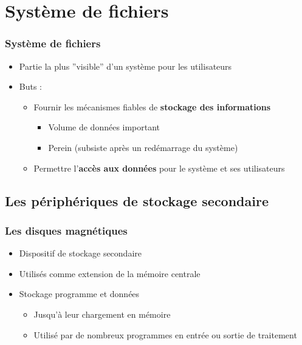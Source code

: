 




\section{Système de fichiers}

\begin{frame}
\frametitle{Système de fichiers}
\begin{itemize}
\item Partie la plus ''visible'' d'un système pour les utilisateurs
\item Buts :
\begin{itemize}
\item Fournir les mécanismes fiables de \textbf{stockage des informations}
\begin{itemize}
\item Volume de données important
\item Perein (subsiste après un redémarrage du système)
\end{itemize}
\item Permettre l'\textbf{accès aux données} pour le système et ses utilisateurs
\end{itemize}
\end{itemize}
\end{frame}


\subsection{Les périphériques de stockage secondaire}

\begin{frame}
\frametitle{Les disques magnétiques}
\begin{itemize}
\item Dispositif de stockage secondaire
\item Utilisés comme extension de la mémoire centrale
\item Stockage programme et données
\begin{itemize}
\item Jusqu’à leur chargement en mémoire
\item Utilisé par de nombreux programmes en entrée ou sortie de traitement
\end{itemize}
\end{itemize}
\end{frame}


